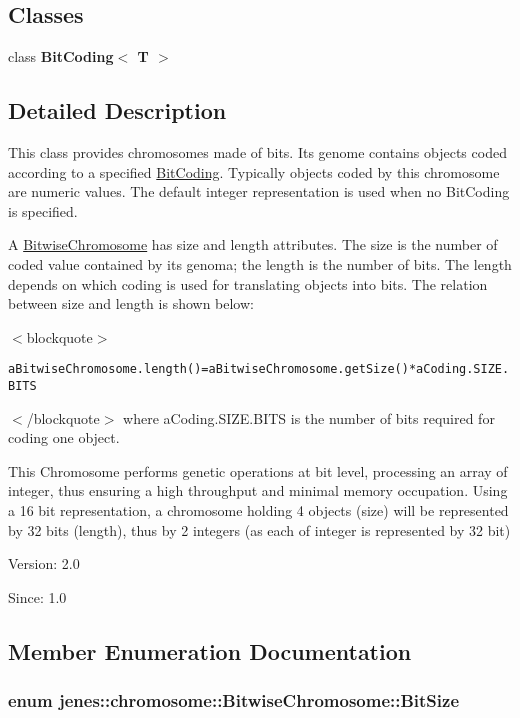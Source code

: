 \subsection*{Classes}
\begin{CompactItemize}
\item 
class \textbf{BitCoding$<$ T $>$}
\end{CompactItemize}


\subsection{Detailed Description}
This class provides chromosomes made of bits. Its genome contains objects coded according to a specified \hyperlink{}{BitCoding}. Typically objects coded by this chromosome are numeric values. The default integer representation is used when no BitCoding is specified. 

A \hyperlink{classjenes_1_1chromosome_1_1_bitwise_chromosome}{BitwiseChromosome} has size and length attributes. The size is the number of coded value contained by its genoma; the length is the number of bits. The length depends on which coding is used for translating objects into bits. The relation between size and length is shown below: 

$<$blockquote$>$\small\begin{alltt}
  aBitwiseChromosome.length() = aBitwiseChromosome.getSize() *  aCoding.SIZE.BITS
 \end{alltt}
\normalsize 
$<$/blockquote$>$ where aCoding.SIZE.BITS is the number of bits required for coding one object. 

This Chromosome performs genetic operations at bit level, processing an array of integer, thus ensuring a high throughput and minimal memory occupation. Using a 16 bit representation, a chromosome holding 4 objects (size) will be represented by 32 bits (length), thus by 2 integers (as each of integer is represented by 32 bit)

\begin{Desc}
\item[Version:]2.0 \end{Desc}
\begin{Desc}
\item[Since:]1.0 \end{Desc}


\subsection{Member Enumeration Documentation}
\hypertarget{classjenes_1_1chromosome_1_1_bitwise_chromosome_dcebd2053ddb9906f17a29837e6ff04c}{
\subsubsection[BitSize]{\setlength{\rightskip}{0pt plus 5cm}enum {\bf jenes::chromosome::BitwiseChromosome::BitSize}}}
\label{classjenes_1_1chromosome_1_1_bitwise_chromosome_dcebd2053ddb9906f17a29837e6ff04c}



